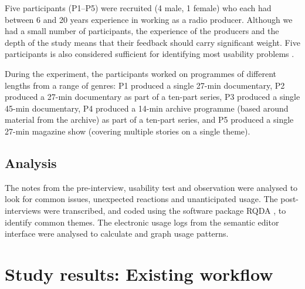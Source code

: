 Five participants (P1--P5) were recruited (4 male, 1 female) who each had between 6 and 20 years experience in working
as a radio producer. Although we had a small number of participants, the experience of the producers and the depth of
the study means that their feedback should carry significant weight. Five participants is also considered sufficient
for identifying most usability problems \citep{Nielsen1993}.

During the experiment, the participants worked on programmes of different lengths from a range of genres:
P1 produced a single 27-min documentary, %
P2 produced a 27-min documentary as part of a ten-part series,
P3 produced a single 45-min documentary,
P4 produced a 14-min archive programme (based around material from the archive) as part of a ten-part series, and
P5 produced a single 27-min magazine show (covering multiple stories on a single theme).

\subsection{Analysis}
The notes from the pre-interview, usability test and observation were analysed to look for common issues, unexpected
reactions and unanticipated usage. The post-interviews were transcribed, and coded using the software package RQDA
\citep{RQDA}, to identify common themes. The electronic usage logs from the semantic editor interface were analysed to
calculate and graph usage patterns.


\section{Study results: Existing workflow}\label{sec:resultsexisting}



